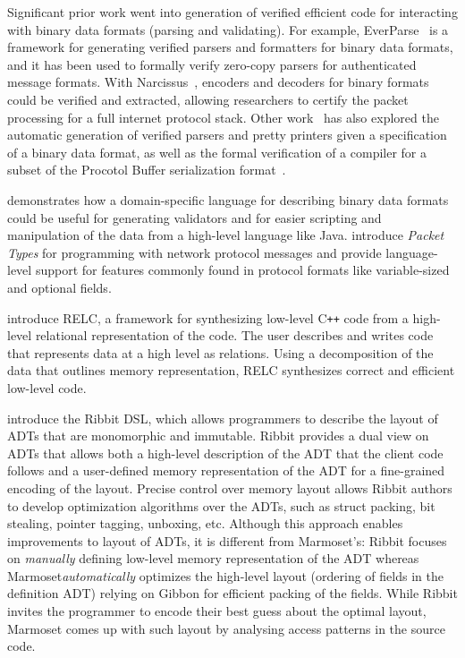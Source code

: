 \documentclass[acmsmall,review,anonymous]{acmart}\settopmatter{printfolios=true,printccs=false,printacmref=false}
\newcommand{\system}{{\sc Marmoset}\xspace}
\newcommand{\ribbit}{{\sc Ribbit}\xspace}
\newcommand{\gibbon}{{\sc Gibbon}\xspace}
\newcommand{\relc}{{\sc RELC}\xspace}
\begin{document}
Significant prior work went into generation of verified efficient code for interacting with binary data formats (parsing and validating). For example, EverParse~\cite{EverParse} is a framework for generating verified parsers and formatters for binary data formats, and it has been used to formally verify zero-copy parsers for authenticated message formats. With Narcissus~\cite{Narcissus}, encoders and decoders for binary formats could be verified and extracted, allowing researchers to certify the packet processing for a full internet protocol stack. Other work~\cite{GenericPacketDescriptions} has also explored the automatic generation of verified parsers and pretty printers given a specification of a binary data format, as well as the formal verification of a compiler for a subset of the Procotol Buffer serialization format~\cite{VPBdeleware}.

\citet{DataScript} demonstrates how a domain-specific language for describing binary data formats could be useful for generating validators and for easier scripting and manipulation of the data from a high-level language like Java. \cite{PacketTypes} introduce \emph{Packet Types} for programming with network protocol messages and provide language-level support for features commonly found in protocol formats like variable-sized and optional fields.

\citet{Hawkins} introduce \relc, a framework for synthesizing low-level C\texttt{++} code from a high-level
relational representation of the code. The user describes and writes code that represents data at a high level as relations. Using a decomposition
of the data that outlines memory representation, \relc synthesizes correct and efficient low-level code.

\citet{BitStealingMadeLegal} introduce the \ribbit DSL, which allows programmers to describe the layout of ADTs that are monomorphic and immutable.
\ribbit provides a dual view on ADTs that allows both a high-level description of the ADT that the client code follows and a user-defined memory representation of the ADT
for a fine-grained encoding of the layout. Precise control over memory layout allows \ribbit authors to develop optimization algorithms over the ADTs, such as struct packing, bit stealing, pointer tagging, unboxing, etc.
Although this approach enables improvements to layout of ADTs, it is different from \system's: \ribbit focuses on \emph{manually} defining low-level memory representation of the ADT whereas \system \emph{automatically} optimizes the high-level layout (ordering of fields in the definition ADT) relying on \gibbon for efficient packing of the fields.
While \ribbit invites the programmer to encode their best guess about the optimal layout, \system comes up with such layout by analysing access patterns in the source code.
\end{document}
